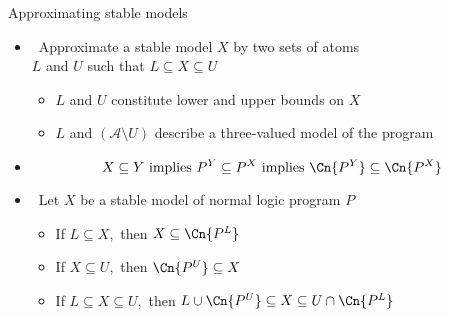 \begin{frame}{Approximating stable models}
  \medskip
  \begin{itemize}
  \item<1->  \ Approximate a stable model $X$ by two sets of atoms\\
    $L$ and $U$ such that
    \(
    L\subseteq X\subseteq U
    \)
    \begin{itemize}\normalsize
    \item $L$ and $U$ constitute lower and upper bounds on $X$
    \item $L$ and $(\mathcal{A}\setminus U)$ describe a three-valued model of the program
    \end{itemize}
    \smallskip
  \item<2-> 
    \[
    X\subseteq Y
    \text{ implies }
    P^Y\subseteq P^X
    \text{ implies }
    \Cn{P^Y}\subseteq\Cn{P^X}
    \]
  \item<3->  \
    Let $X$ be a stable model of normal logic program $P$
    \begin{itemize}\normalsize
    \item<4-> If $L\subseteq X$,\pause[5]\
      then $X\subseteq\Cn{P^L}$
    \item<6-> If $X\subseteq U$,\pause[7]\
      then $\Cn{P^U}\subseteq X$
    \item<8-> If $L\subseteq X\subseteq U$,\pause[9]\
      then $L\cup\Cn{P^U}\subseteq X\subseteq U\cap\Cn{P^L}$
    \end{itemize}
  \end{itemize}
\end{frame}
